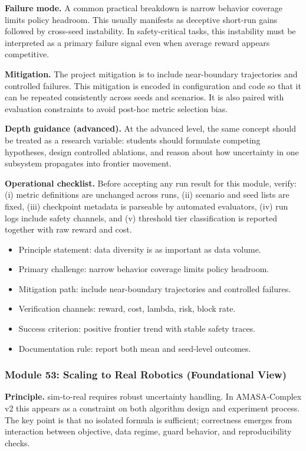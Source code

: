\documentclass[conference]{IEEEtran}
\begin{document}
\textbf{Failure mode.} A common practical breakdown is narrow behavior coverage limits policy headroom. This usually manifests as deceptive short-run gains followed by cross-seed instability. In safety-critical tasks, this instability must be interpreted as a primary failure signal even when average reward appears competitive.

\textbf{Mitigation.} The project mitigation is to include near-boundary trajectories and controlled failures. This mitigation is encoded in configuration and code so that it can be repeated consistently across seeds and scenarios. It is also paired with evaluation constraints to avoid post-hoc metric selection bias.

\textbf{Depth guidance (advanced).} At the advanced level, the same concept should be treated as a research variable: students should formulate competing hypotheses, design controlled ablations, and reason about how uncertainty in one subsystem propagates into frontier movement.

\textbf{Operational checklist.} Before accepting any run result for this module, verify: (i) metric definitions are unchanged across runs, (ii) scenario and seed lists are fixed, (iii) checkpoint metadata is parseable by automated evaluators, (iv) run logs include safety channels, and (v) threshold tier classification is reported together with raw reward and cost.

\begin{itemize}[leftmargin=*]
  \item Principle statement: data diversity is as important as data volume.
  \item Primary challenge: narrow behavior coverage limits policy headroom.
  \item Mitigation path: include near-boundary trajectories and controlled failures.
  \item Verification channels: reward, cost, lambda, risk, block rate.
  \item Success criterion: positive frontier trend with stable safety traces.
  \item Documentation rule: report both mean and seed-level outcomes.
\end{itemize}


\subsubsection{Module 53: Scaling to Real Robotics (Foundational View)}
\textbf{Principle.} sim-to-real requires robust uncertainty handling. In AMASA-Complex v2 this appears as a constraint on both algorithm design and experiment process. The key point is that no isolated formula is sufficient; correctness emerges from interaction between objective, data regime, guard behavior, and reproducibility checks.
\end{document}
